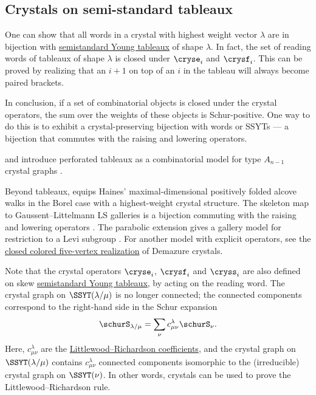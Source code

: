 \subsection[crystalSsyt]{Crystals on semi-standard tableaux}

One can show that all words in a crystal with highest weight vector $\lambda$
are in bijection with \hyperref[semistandardYoungTableau]{semistandard Young
tableaux} of shape $\lambda$.
In fact, the set of reading words of tableaux of shape $\lambda$ is 
closed under $\cryse_i$ and $\crysf_i$.
This can be proved by realizing that an $i+1$ on 
top of an $i$ in the tableau will always become paired brackets.


In conclusion, if a set of combinatorial objects is closed under the crystal operators,
the sum over the weights of these objects is Schur-positive.
One way to do this is to exhibit a crystal-preserving bijection with words or SSYTs 
--- a bijection that commutes with the raising and lowering operators.

 and  introduce perforated
tableaux as a combinatorial model for type $A_{n-1}$ crystal graphs
\cite{ApplebyWhitehead2020}.

Beyond tableaux,  equips Haines' maximal-dimensional
positively folded alcove walks in the Borel case with a highest-weight
crystal structure. The skeleton map to Gaussent--Littelmann LS galleries
is a bijection commuting with the raising and lowering operators
\cite[Thms.~A--B]{Wang2026Alcove}. The parabolic extension gives a
gallery model for restriction to a Levi subgroup
\cite[Thm.~C]{Wang2026Alcove}.
For another model with explicit operators, see the
\hyperref[latticeModelDemazure]{closed colored five-vertex realization}
of Demazure crystals.


Note that the crystal operators $\cryse_i$, $\crysf_i$ and $\cryss_i$
are also defined on skew \hyperref[semistandardYoungTableau]{semistandard
Young tableaux}, by acting on the
reading word.
The crystal graph on $\SSYT(\lambda/\mu)$ is no longer connected; the connected components
correspond to the right-hand side in the Schur expansion
\[
\schurS_{\lambda/\mu} = \sum_{\nu} c^{\lambda}_{\mu \nu} \schurS_\nu.
\]
Here, $c^{\lambda}_{\mu \nu}$ are the \hyperref[schurLittlewoodRichardson]{Littlewood--Richardson coefficients},
and the crystal graph on $\SSYT(\lambda/\mu)$ contains $c^{\lambda}_{\mu \nu}$
connected components isomorphic to the (irreducible) crystal graph on $\SSYT(\nu)$.
In other words, crystals can be used to prove the Littlewood--Richardson rule.

